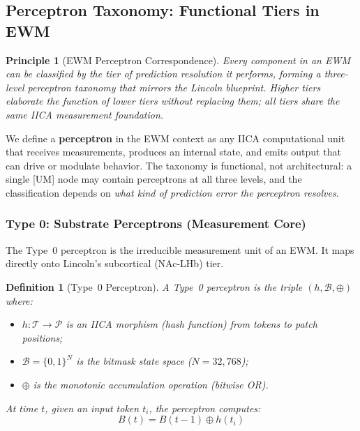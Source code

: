 \documentclass[11pt,a4paper]{article}
\newtheorem{principle}{Principle}[section]
\newtheorem{definition}{Definition}[section]
\theoremstyle{remark}
\begin{document}
\subsection{Perceptron Taxonomy: Functional Tiers in EWM}
\label{sec:perceptron-taxonomy}

\begin{principle}[EWM Perceptron Correspondence]
\label{prin:perceptron}
Every component in an EWM can be classified by the tier of prediction
resolution it performs, forming a three-level perceptron taxonomy that mirrors
the Lincoln blueprint. Higher tiers elaborate the function of lower tiers
without replacing them; all tiers share the same IICA measurement foundation.
\end{principle}

We define a \textbf{perceptron} in the EWM context as any IICA computational
unit that receives measurements, produces an internal state, and emits output
that can drive or modulate behavior. The taxonomy is functional, not
architectural: a single [UM] node may contain perceptrons at all three levels,
and the classification depends on \textit{what kind of prediction error the
perceptron resolves}.

\subsubsection{Type 0: Substrate Perceptrons (Measurement Core)}

The Type~0 perceptron is the irreducible measurement unit of an EWM. It maps
directly onto Lincoln's subcortical (NAc-LHb) tier.

\begin{definition}[Type~0 Perceptron]
A Type~0 perceptron is the triple $(h, \mathcal{B}, \oplus)$ where:
\begin{itemize}[leftmargin=*,nosep]
  \item $h: \mathcal{T} \to \mathcal{P}$ is an IICA morphism (hash function)
    from tokens to patch positions;
  \item $\mathcal{B} = \{0, 1\}^N$ is the bitmask state space ($N =
    32{,}768$);
  \item $\oplus$ is the monotonic accumulation operation (bitwise OR).
\end{itemize}
At time $t$, given an input token $t_i$, the perceptron computes:
\begin{equation}
  B(t) = B(t-1) \oplus h(t_i)
\end{equation}
\end{definition}
\end{document}
